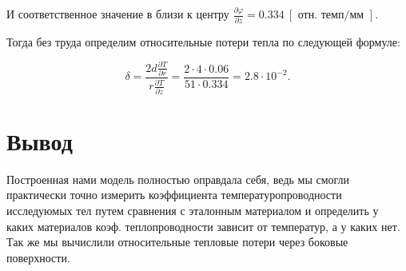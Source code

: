\documentclass[a4paper,11.5pt]{article} %
\begin{document}
И соответственное значение в близи к центру $\frac{\partial \varphi }{\partial z} = 0.334 \ [\text{ отн. темп} / \text{мм }].$

Тогда без труда определим относительные потери тепла по следующей формуле:

\[ \delta = \frac{2d \frac{\partial T}{\partial r}}{r \frac{\partial T}{\partial z}}  = \frac{2 \cdot 4 \cdot 0.06}{51 \cdot 0.334} = 2.8 \cdot 10^{-2} .\]


\section{Вывод}
Построенная нами модель полностью оправдала себя, ведь мы смогли практически точно измерить коэффициента температуропроводности исследуюмых тел путем сравнения с эталонным материалом и определить у каких материалов коэф. теплопроводности зависит от температур, а у каких нет. Так же мы вычислили относительные тепловые потери через боковые поверхности.

\begin{figure}[h]
\end{figure}


					
\end{document}
